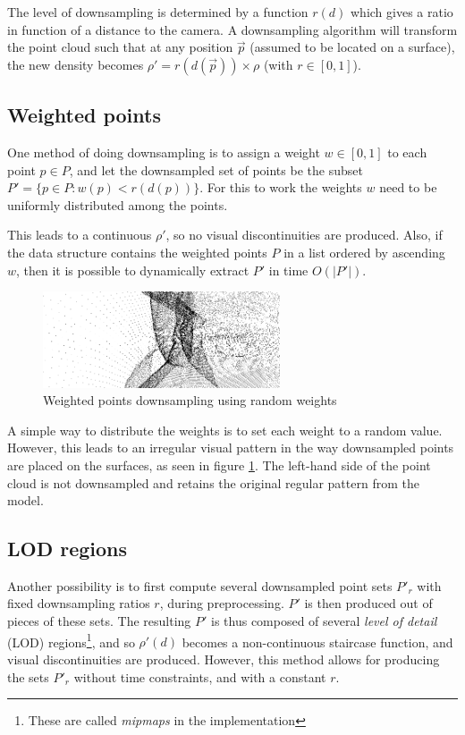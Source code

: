 \documentclass[a4paper,10pt,abstracton,notitlepage]{scrreprt}
\begin{document}
The level of downsampling is determined by a function $r(d)$ which gives a ratio in function of a distance to the camera. A downsampling algorithm will transform the point cloud such that at any position $\overrightarrow{p}$ (assumed to be located on a surface), the new density becomes $\rho' = r(d(\overrightarrow{p})) \times \rho$ (with $r \in [0, 1]$).

\subsection{Weighted points}
One method of doing downsampling is to assign a weight $w \in [0, 1]$ to each point $p \in P$, and let the downsampled set of points be the subset $P' = \{ p \in P : w(p) < r(d(p)) \}$. For this to work the weights $w$ need to be uniformly distributed among the points.

This leads to a continuous $\rho'$, so no visual discontinuities are produced. Also, if the data structure contains the weighted points $P$ in a list ordered by ascending $w$, then it is possible to dynamically extract $P'$ in time $O(|P'|)$.

\begin{figure}
\includegraphics[width=7cm,frame]{random_weights_inv.png}
\caption{Weighted points downsampling using random weights}
\label{fig:random_weights}
\end{figure}
A simple way to distribute the weights is to set each weight to a random value. However, this leads to an irregular visual pattern in the way downsampled points are placed on the surfaces, as seen in figure \ref{fig:random_weights}. The left-hand side of the point cloud is not downsampled and retains the original regular pattern from the model.

\subsection{LOD regions}
Another possibility is to first compute several downsampled point sets $P'_{r}$ with fixed downsampling ratios $r$, during preprocessing. $P'$ is then produced out of pieces of these sets. The resulting $P'$ is thus composed of several \emph{level of detail} (LOD) regions\footnote{These are called \emph{mipmaps} in the implementation}, and so $\rho'(d)$ becomes a non-continuous staircase function, and visual discontinuities are produced. However, this method allows for producing the sets $P'_{r}$ without time constraints, and with a constant $r$.
\end{document}
